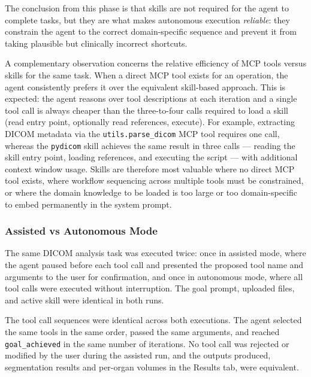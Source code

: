 \documentclass[conference]{IEEEtran}
\begin{document}
The conclusion from this phase is that skills are not required for the agent to complete tasks, but they are what makes autonomous execution \emph{reliable}: they constrain the agent to the correct domain-specific sequence and prevent it from taking plausible but clinically incorrect shortcuts.

A complementary observation concerns the relative efficiency of MCP tools versus skills for the same task. When a direct MCP tool exists for an operation, the agent consistently prefers it over the equivalent skill-based approach. This is expected: the agent reasons over tool descriptions at each iteration and a single tool call is always cheaper than the three-to-four calls required to load a skill (read entry point, optionally read references, execute).
For example, extracting DICOM metadata via the \texttt{utils.parse\_dicom} MCP tool requires one call, whereas the \texttt{pydicom} skill achieves the same result in three calls --- reading the skill entry point, loading references, and executing the script --- with additional context window usage. Skills are therefore most valuable where no direct MCP tool exists, where workflow sequencing across multiple tools must be constrained, or where the domain knowledge to be loaded is too large or too domain-specific to embed permanently in the system prompt.

\subsubsection{Assisted vs Autonomous Mode}

The same DICOM analysis task was executed twice: once in assisted mode, where the agent paused before each tool call and presented the proposed tool name and arguments to the user for confirmation, and once in autonomous mode, where all tool calls were executed without interruption. The goal prompt, uploaded files, and active skill were identical in both runs.

The tool call sequences were identical across both executions. The agent selected the same tools in the same order, passed the same arguments, and reached \texttt{goal\_achieved} in the same number of iterations. No tool call was rejected or modified by the user during the assisted run, and the outputs produced, segmentation results and per-organ volumes in the Results tab, were equivalent.
\end{document}
